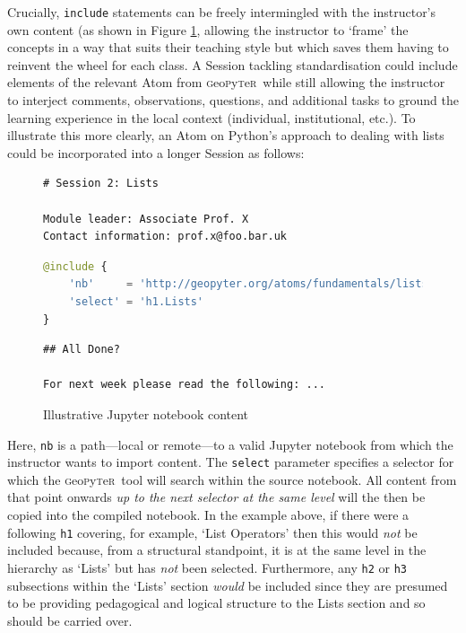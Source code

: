 \documentclass[letter, 11pt,titlepage]{article}
\newcommand{\gp}{\textsc{g}eo\textsc{p}y\textsc{t}e\textsc{r}~\/}
\begin{document}
Crucially, \texttt{include} statements can be freely intermingled with the instructor's own content (as shown in Figure \ref{fig:include}, allowing the instructor to `frame' the concepts in a way that suits their teaching style but which saves them having to reinvent the wheel for each class. A Session tackling standardisation could include elements of the relevant Atom from \gp while still allowing the instructor to interject comments, observations, questions, and additional tasks to ground the learning experience in the local context (individual, institutional, etc.). To illustrate this more clearly, an Atom on Python's approach to dealing with lists could be incorporated into a longer Session as follows:

\begin{figure}
	\centering 
	\caption{Illustrative Jupyter notebook content}
	\label{fig:include}
\begin{lstlisting}[language=HTML,frame=single]
# Session 2: Lists

Module leader: Associate Prof. X
Contact information: prof.x@foo.bar.uk
\end{lstlisting}	
\begin{lstlisting}[language=Python,frame=single]
@include {
    'nb'     = 'http://geopyter.org/atoms/fundamentals/lists.ipynb',
    'select' = 'h1.Lists'
}
\end{lstlisting}

\begin{lstlisting}[language=HTML,frame=single]
## All Done?

For next week please read the following: ...
\end{lstlisting}

\end{figure}

Here, \texttt{nb} is a path---local or remote---to a valid Jupyter notebook from which the instructor wants to import content. The \texttt{select} parameter specifies a selector for which the \gp tool will search within the source notebook. All content from that point onwards \emph{up to the next selector at the same level} will the then be copied into the compiled notebook. In the example above, if there were a following \texttt{h1} covering, for example, `List Operators' then this would \emph{not} be included because, from a structural standpoint, it is at the same level in the hierarchy as `Lists' but has \emph{not} been selected. Furthermore, any \texttt{h2} or \texttt{h3} subsections within the `Lists' section \emph{would} be included since they are presumed to be providing pedagogical and logical structure to the Lists section and so should be carried over.
\end{document}
